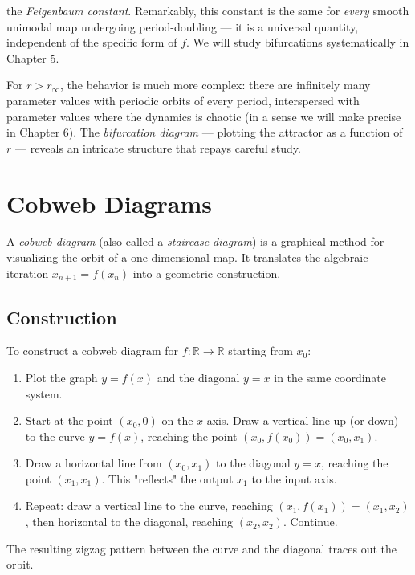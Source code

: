 the \textit{Feigenbaum constant}. Remarkably, this constant is the same for \textit{every} smooth unimodal map undergoing period-doubling --- it is a universal quantity, independent of the specific form of $f$. We will study bifurcations systematically in Chapter 5.

For $r > r_\infty$, the behavior is much more complex: there are infinitely many parameter values with periodic orbits of every period, interspersed with parameter values where the dynamics is chaotic (in a sense we will make precise in Chapter 6). The \textit{bifurcation diagram} --- plotting the attractor as a function of $r$ --- reveals an intricate structure that repays careful study.


\section{Cobweb Diagrams}\label{sec:2.5}

A \textit{cobweb diagram} (also called a \textit{staircase diagram}) is a graphical method for visualizing the orbit of a one-dimensional map. It translates the algebraic iteration $x_{n+1} = f(x_n)$ into a geometric construction.

\subsection{Construction}\label{sec:2.5.1}

To construct a cobweb diagram for $f: \mathbb{R} \to \mathbb{R}$ starting from $x_0$:

\begin{enumerate}[nosep]
  \item Plot the graph $y = f(x)$ and the diagonal $y = x$ in the same coordinate system.
  \item Start at the point $(x_0, 0)$ on the $x$-axis. Draw a vertical line up (or down) to the curve $y = f(x)$, reaching the point $(x_0, f(x_0)) = (x_0, x_1)$.
  \item Draw a horizontal line from $(x_0, x_1)$ to the diagonal $y = x$, reaching the point $(x_1, x_1)$. This "reflects" the output $x_1$ to the input axis.
  \item Repeat: draw a vertical line to the curve, reaching $(x_1, f(x_1)) = (x_1, x_2)$, then horizontal to the diagonal, reaching $(x_2, x_2)$. Continue.
\end{enumerate}

The resulting zigzag pattern between the curve and the diagonal traces out the orbit.

